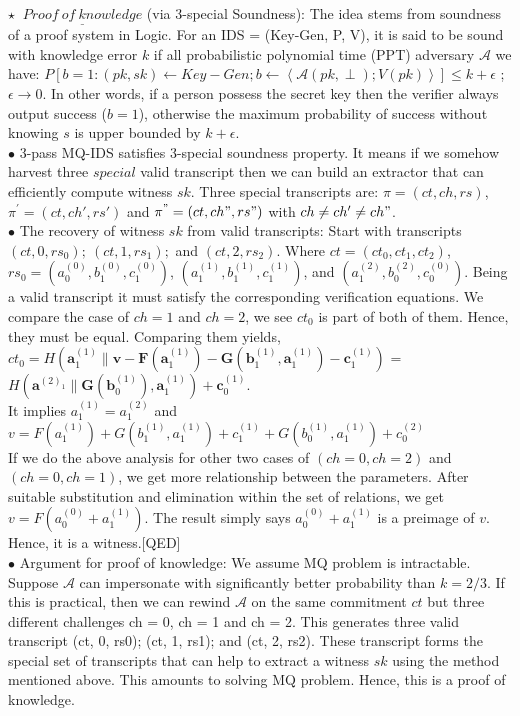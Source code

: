 \documentclass{article}
\begin{document}
$\star\ $ $\underline{Proof\ of\ knowledge}$ (via 3-special Soundness): The idea stems from soundness of a proof system in Logic. For an IDS = (Key-Gen, P, V), it is said to be sound with knowledge error $k$ if all probabilistic polynomial time (PPT) adversary $\mathcal{A}$ we have: $P[b=1:(pk, sk)\leftarrow Key-Gen;b\leftarrow \left\langle \mathcal{A}(pk,\perp);V(pk) \right\rangle]\leq k+ \epsilon$ ; $\epsilon \rightarrow 0$. In other words, if a person possess the secret key then the verifier always output success ($b=1$), otherwise the maximum probability of success without knowing $s$ is upper bounded by $k + \epsilon$.\\
$\bullet$ 3-pass MQ-IDS satisfies 3-special soundness property. It means if we somehow harvest three $special$ valid transcript then we can build an extractor that can efficiently compute witness $sk$. Three special transcripts are: $\pi = (ct,ch,rs)$, $\pi^{'} = (ct,ch',rs')$ and $\pi^{"} = (ct,ch",rs")$ with $ch\neq ch'\neq ch"$.\\ 
$\bullet$ The recovery of witness $sk$ from valid transcripts: Start with transcripts $(ct,0,rs_0);\ (ct,1,rs_1);$ and $(ct,2,rs_2)$. Where $ct= (ct_0,ct_1, ct_2)$, $rs_0= (a^{(0)} _0, b^{(0)} _1, c^{(0)} _1 )$, $(a^{(1)} _1, b^{(1)} _1, c^{(1)} _1 )$, and $(a^{(2)} _1, b^{(2)} _0, c^{(0)} _0)$.
Being a valid transcript it must satisfy the corresponding verification equations. We compare the case of $ch=1$ and $ch=2$, we see $ct_0$ is part of both of them. Hence, they must be equal. Comparing them yields,\\
$ct_0 = H(\textbf{a}^{(1)}_1 \parallel \textbf{v}- \textbf{F}(\textbf{a}^{(1)} _1) - \textbf{G}(\textbf{b}^{(1)} _1, \textbf{a}^{(1)} _1) -\textbf{c}^{(1)} _1)$ = $ H(\textbf{a}^{(2) _1} \parallel \textbf{G}(\textbf{b}^{(1)} _0), \textbf{a}^{(1)} _1) + \textbf{c}^{(1)} _0$. \\ 
It implies $a^{(1)}_1 = a^{(2)}_1$ and $v= F(a^{(1)} _1) + G(b^{(1)} _1, a^{(1)} _1) + c^{(1)} _1 + G(b^{(1)} _0, a^{(1)} _1 ) + c^{(2)} _0$\\
If we do the above analysis for other two cases of $(ch=0, ch=2)$ and $(ch=0, ch=1)$, we get more relationship between the parameters. After suitable substitution and elimination within the set of relations, we get $v=F(a^{(0)} _0 + a^{(1)} _1)$. 
 The result simply says $a^{(0)} _0 + a^{(1)} _1$ is a preimage of $v$. Hence, it is a witness.[QED]\\
 $\bullet$ Argument for proof of knowledge: We assume MQ problem is intractable. Suppose $\mathcal{A}$ can impersonate with significantly better probability than $k =2/3$. If this is practical, then we can rewind $\mathcal{A}$ on the same commitment $ct$ but three different challenges ch = 0, ch = 1 and ch = 2. This generates three valid transcript (ct, 0, rs0); (ct, 1, rs1); and (ct, 2, rs2). These transcript forms the special set of transcripts that can help to extract a witness $sk$ using the method mentioned above. This amounts to solving MQ problem. Hence, this is a proof of knowledge.\\
\end{document}
